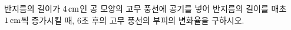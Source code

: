반지름의 길이가 $4\mkern3mu \mathrm{cm}$인 공 모양의 고무 풍선에 공기를 넣어 반지름의 길이를 매초 $1\mkern3mu \mathrm{cm}$씩 증가시킬 때, $6$초 후의 고무 풍선의 부피의 변화율을 구하시오.
